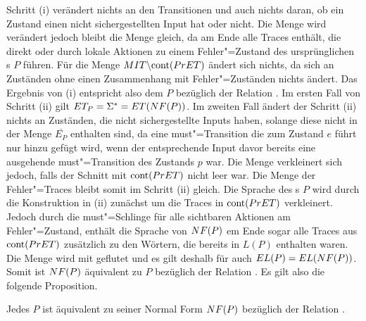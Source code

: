 Schritt (i) verändert nichts an den Transitionen und auch nichts daran, ob ein
Zustand einen nicht sichergestellten Input hat oder nicht. Die Menge \StET{}
wird verändert jedoch bleibt die Menge \PrET{} gleich, da \StET{} am Ende alle
Traces enthält, die direkt oder durch lokale Aktionen zu einem Fehler"=Zustand
des ursprünglichen \MEIO{}s $P$ führen. Für die Menge $MIT\backslash\mathrm{cont}
(PrET)$ ändert sich nichts, da sich an Zuständen ohne einen Zusammenhang mit
Fehler"=Zuständen nichts ändert. Das Ergebnis von (i) entspricht also dem
\MEIO{} $P$ bezüglich der Relation \ERel{}. Im ersten Fall von Schritt (ii)
gilt $ET _P =\Sigma ^* = ET (NF (P))$. Im zweiten Fall ändert der Schritt
(ii) nichts an Zuständen, die nicht sichergestellte Inputs haben, solange diese
nicht in der Menge $\overline{E_P}$ enthalten sind, da eine must"=Transition
die zum Zustand $e$ führt nur hinzu gefügt wird, wenn der entsprechende Input
davor bereits eine ausgehende must"=Transition des Zustands $p$ war. Die Menge
\MIT{} verkleinert sich jedoch, falls der Schnitt mit $\mathrm{cont} (PrET)$ nicht
leer war. Die Menge der Fehler"=Traces \ET{} bleibt somit im Schritt (ii)
gleich. Die Sprache des \MEIO{}s $P$ wird durch die Konstruktion in (ii)
zunächst um die Traces in $\mathrm{cont} (PrET)$ verkleinert. Jedoch durch die
must"=Schlinge für alle sichtbaren Aktionen am Fehler"=Zustand, enthält die
Sprache von $NF (P)$ em Ende sogar alle Traces aus $\mathrm{cont} (PrET)$ zusätzlich
zu den Wörtern, die bereits in $L (P)$ enthalten waren. Die Menge \EL{} wird
mit \ET{} geflutet und es gilt deshalb für \EL{} auch $EL (P) = EL (NF
(P))$. Somit ist $NF (P)$ äquivalent zu $P$ bezüglich der Relation \ERel{}. Es
gilt also die folgende Proposition.

\begin{Prop}
  \label{FehlerNormalFormProp}
  Jedes \MEIO{} $P$ ist äquivalent zu seiner Normal Form $NF (P)$ bezüglich
  der Relation \ERel{}.
\end{Prop}

